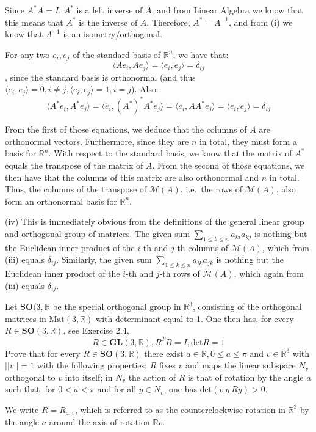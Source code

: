 \begin{solution}
    Since $A^*A = I$, $A^*$ is a left inverse of $A$, and from Linear Algebra we know that this means that $A^*$ is the inverse of $A$. Therefore, $A^* = A^{-1}$, and from (i) we know that $A^{-1}$ is an isometry/orthogonal.

    For any two $e_i, e_j$ of the standard basis of $\mathbb{R}^n$, we have that:
    $$\langle Ae_i, Ae_j \rangle = \langle e_i, e_j \rangle = \delta_{ij}$$
    , since the standard basis is orthonormal (and thus $\langle e_i, e_j \rangle = 0, i \neq j, \langle e_i, e_j \rangle = 1, i = j$). Also:
    $$\langle A^*e_i, A^*e_j \rangle = \langle e_i, (A^*)^*A^*e_j \rangle = \langle e_i, AA^*e_j \rangle = \langle e_i, e_j \rangle = \delta_{ij}$$

    From the first of those equations, we deduce that the columns of $A$ are orthonormal vectors. Furthermore, since they are $n$ in total, they must form a basis for $\mathbb{R}^n$. With respect to the standard basis, we know that the matrix of $A^*$ equals the transpose of the matrix of $A$. From the second of those equations, we then have that the columns of this matrix are also orthonormal and $n$ in total. Thus, the columns of the transpose of $\mathcal{M}(A)$, i.e.\ the rows of $\mathcal{M}(A)$, also form an orthonormal basis for $\mathbb{R}^n$.

    (iv) This is immediately obvious from the definitions of the general linear group and orthogonal group of matrices. The given sum $\sum_{1 \leq k \leq n} a_{ki}a_{kj}$ is nothing but the Euclidean inner product of the $i$-th and $j$-th columns of $\mathcal{M}(A)$, which from (iii) equals $\delta_{ij}$. Similarly, the given sum $\sum_{1 \leq k \leq n} a_{ik}a_{jk}$ is nothing but the Euclidean inner product of the $i$-th and $j$-th rows of $\mathcal{M}(A)$, which again from (iii) equals $\delta_{ij}$.
\end{solution}

\begin{exercise}{5}
    Let $\textbf{SO}(3, \mathbb{R}$ be the special orthogonal group in $\mathbb{R}^3$, consisting of the orthogonal matrices in $\text{Mat}(3, \mathbb{R})$ with determinant equal to 1. One then has, for every $R \in \textbf{SO}(3, \mathbb{R})$, see Exercise 2.4,
    $$R \in \textbf{GL}(3, \mathbb{R}), R^TR = I, \text{det} R = 1$$
    Prove that for every $R \in \textbf{SO}(3, \mathbb{R})$ there exist $a \in \mathbb{R}, 0 \leq a \leq \pi$ and $v \in \mathbb{R}^3$ with $\lvert \lvert v \rvert \rvert = 1$ with the following properties: $R$ fixes $v$ and maps the linear subspace $N_v$ orthogonal to $v$ into itself; in $N_v$ the action of $R$ is that of rotation by the angle $a$ such that, for $0 < a < \pi$ and for all $y \in N_v$, one has $\text{det}(v \ y \ Ry) > 0$.

    We write $R=R_{a, v}$, which is referred to as the counterclockwise rotation in $\mathbb{R}^3$ by the angle $a$ around the axis of rotation $\mathbb{R}v$.
\end{exercise}

